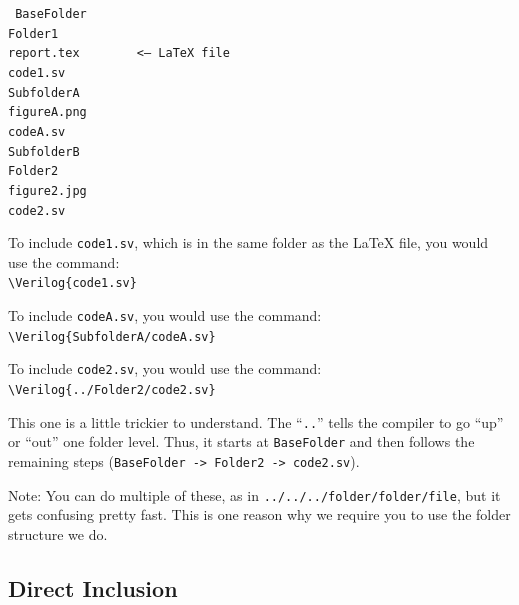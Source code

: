 \documentclass[11pt]{article}
\newcommand{\Verilog}[2][]{%
	
}
\begin{document}
\texttt{%
\hspace*{5ex}BaseFolder \\
	\hspace*{10ex}Folder1 \\
		\hspace*{15ex}report.tex ~~~~~~ <-- LaTeX file\\
		\hspace*{15ex}code1.sv \\
		\hspace*{15ex}SubfolderA \\
			\hspace*{20ex}figureA.png \\
			\hspace*{20ex}codeA.sv \\
		\hspace*{15ex}SubfolderB \\
	\hspace*{10ex}Folder2 \\	
		\hspace*{15ex}figure2.jpg \\
		\hspace*{15ex}code2.sv 
}

To include \texttt{code1.sv}, which is in the same folder as the LaTeX file, you would use the command:\\
\hspace*{5ex}\verb|\Verilog{code1.sv}|

To include \texttt{codeA.sv}, you would use the command:\\
\hspace*{5ex}\verb|\Verilog{SubfolderA/codeA.sv}|

To include \texttt{code2.sv}, you would use the command:\\
\hspace*{5ex}\verb|\Verilog{../Folder2/code2.sv}|

This one is a little trickier to understand.  The ``\texttt{..}'' tells the compiler to go ``up'' or ``out'' one folder level.  Thus, it starts at \texttt{BaseFolder} and then follows the remaining steps (\texttt{BaseFolder -> Folder2 -> code2.sv}).  

Note: You can do multiple of these, as in \texttt{../../../folder/folder/file}, but it gets confusing pretty fast.  This is one reason why we require you to use the folder structure we do.

\subsection*{Direct Inclusion}
\end{document}
